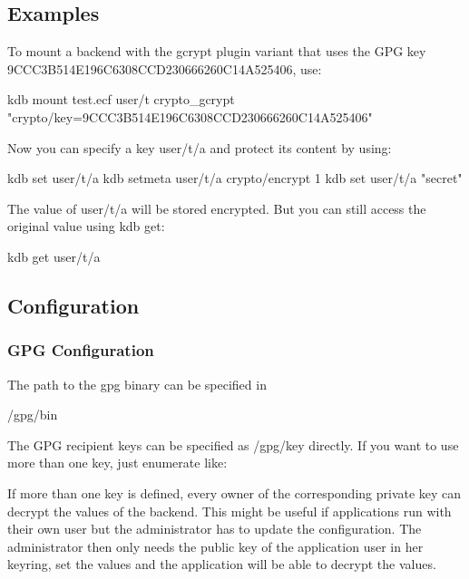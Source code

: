 \subsection*{Examples}

To mount a backend with the gcrypt plugin variant that uses the G\+P\+G key 9\+C\+C\+C3\+B514\+E196\+C6308\+C\+C\+D230666260\+C14\+A525406, use\+: \begin{DoxyVerb}    kdb mount test.ecf user/t crypto_gcrypt "crypto/key=9CCC3B514E196C6308CCD230666260C14A525406"
\end{DoxyVerb}


Now you can specify a key {\ttfamily user/t/a} and protect its content by using\+: \begin{DoxyVerb}    kdb set user/t/a
    kdb setmeta user/t/a crypto/encrypt 1
    kdb set user/t/a "secret"
\end{DoxyVerb}


The value of {\ttfamily user/t/a} will be stored encrypted. But you can still access the original value using {\ttfamily kdb get}\+: \begin{DoxyVerb}    kdb get user/t/a
\end{DoxyVerb}


\subsection*{Configuration}

\subsubsection*{G\+P\+G Configuration}

The path to the gpg binary can be specified in \begin{DoxyVerb}    /gpg/bin
\end{DoxyVerb}


The G\+P\+G recipient keys can be specified as {\ttfamily /gpg/key} directly. If you want to use more than one key, just enumerate like\+: 


If more than one key is defined, every owner of the corresponding private key can decrypt the values of the backend. This might be useful if applications run with their own user but the administrator has to update the configuration. The administrator then only needs the public key of the application user in her keyring, set the values and the application will be able to decrypt the values.

